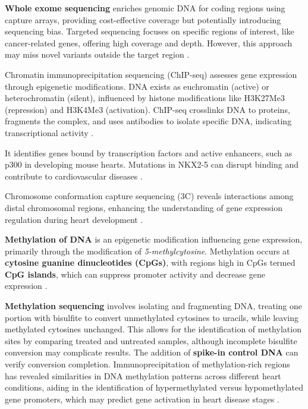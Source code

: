 \textbf{Whole exome sequencing} enriches genomic DNA for coding regions using capture arrays, providing cost-effective coverage but potentially introducing sequencing bias. Targeted sequencing focuses on specific regions of interest, like cancer-related genes, offering high coverage and depth. However, this approach may miss novel variants outside the target region \cite*{L5-HighThroughput}.

Chromatin immunoprecipitation sequencing (ChIP-seq) assesses gene expression through epigenetic modifications. DNA exists as euchromatin (active) or heterochromatin (silent), influenced by histone modifications like H3K27Me3 (repression) and H3K4Me3 (activation). ChIP-seq crosslinks DNA to proteins, fragments the complex, and uses antibodies to isolate specific DNA, indicating transcriptional activity \cite*{L5-HighThroughput}.

It identifies genes bound by transcription factors and active enhancers, such as p300 in developing mouse hearts. Mutations in NKX2-5 can disrupt binding and contribute to cardiovascular diseases \cite*{L5-HighThroughput}.

Chromosome conformation capture sequencing (3C) reveals interactions among distal chromosomal regions, enhancing the understanding of gene expression regulation during heart development \cite*{L5-HighThroughput}.

\textbf{Methylation of DNA} is an epigenetic modification influencing gene expression, primarily through the modification of \textit{5-methylcytosine}. Methylation occurs at \textbf{cytosine guanine dinucleotides (CpGs)}, with regions high in CpGs termed \textbf{CpG islands}, which can suppress promoter activity and decrease gene expression \cite*{L5-HighThroughput}. 

\textbf{Methylation sequencing} involves isolating and fragmenting DNA, treating one portion with bisulfite to convert unmethylated cytosines to uracils, while leaving methylated cytosines unchanged. This allows for the identification of methylation sites by comparing treated and untreated samples, although incomplete bisulfite conversion may complicate results. The addition of \textbf{spike-in control DNA} can verify conversion completion. Immunoprecipitation of methylation-rich regions has revealed similarities in DNA methylation patterns across different heart conditions, aiding in the identification of hypermethylated versus hypomethylated gene promoters, which may predict gene activation in heart disease stages \cite*{L5-HighThroughput}.

